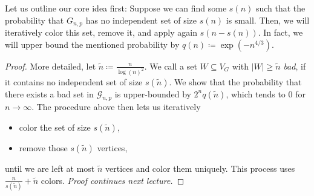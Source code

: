 Let us outline our core idea first:
Suppose we can find some $s(n)$ such that the probability that ${G}_{n,p}$ has no independent set of size $s(n)$ is small.
Then, we will iteratively color this set, remove it, and apply again $s(n - s(n))$.
In fact, we will upper bound the mentioned probability by $q(n) \coloneqq \exp(-n^{4/3})$.
\begin{proof}
    More detailed, let $\tilde n \coloneqq \frac{n}{\log(n)^2}$.
    We call a set $W \subseteq V_G$ with $|W| \geq \tilde n$ \emph{bad},
    if it contains no independent set of size $s(\tilde n)$.
    We show that the probability that there exists a bad set in $\mathcal{G}_{n,p}$
    is upper-bounded by $2^n q(\tilde n)$, which tends to 0 for $n \rightarrow \infty$.
    The procedure above then lets us iteratively
    \begin{itemize}
        \item color the set of size $s(\tilde n)$,
        \item remove those $s(\tilde n)$ vertices,
    \end{itemize}
    until we are left at most $\tilde n$ vertices and color them uniquely.
    This process uses $\frac{n}{s(\tilde n)}+\tilde n$ colors. \emph{Proof continues next lecture.}
\end{proof}